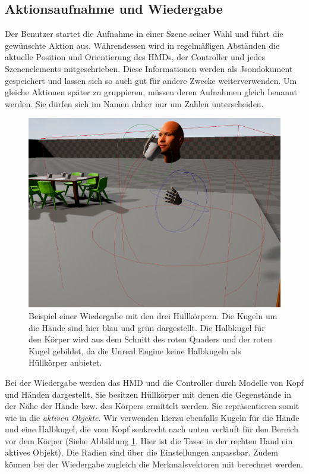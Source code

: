 \subsection{Aktionsaufnahme und Wiedergabe}
Der Benutzer startet die Aufnahme in einer Szene seiner Wahl und führt die gewünschte Aktion aus. Währendessen wird in regelmäßigen Abständen die aktuelle Position und Orientierung des HMDs, der Controller und jedes Szenenelements mitgeschrieben. Diese Informationen werden als Jsondokument gespeichert und lassen sich so auch gut für andere Zwecke weiterverwenden. Um gleiche Aktionen später zu gruppieren, müssen deren Aufnahmen gleich benannt werden. Sie dürfen sich im Namen daher nur um Zahlen unterscheiden.\newline
\begin{figure}[hbtp]
\includegraphics[width=1.0\linewidth]{PlaybackActor.png}
\caption{Beispiel einer Wiedergabe mit den drei Hüllkörpern. Die Kugeln um die Hände sind hier blau und grün dargestellt. Die Halbkugel für den Körper wird aus dem Schnitt des roten Quaders und der roten Kugel gebildet, da die Unreal Engine keine Halbkugeln als Hüllkörper anbietet.}
\label{fig:playback-actor}
\end{figure}
Bei der Wiedergabe werden das HMD und die Controller durch Modelle von Kopf und Händen dargestellt. Sie besitzen Hüllkörper mit denen die Gegenstände in der Nähe der Hände bzw. des Körpers ermittelt werden. Sie repräsentieren somit wie in \cite{scene-grok} die \textit{aktiven Objekte}. Wir verwenden hierzu ebenfalls Kugeln für die Hände und eine Halbkugel, die vom Kopf senkrecht nach unten verläuft für den Bereich vor dem Körper (Siehe Abbildung \ref{fig:playback-actor}. Hier ist die Tasse in der rechten Hand ein aktives Objekt). Die Radien sind über die Einstellungen anpassbar. Zudem können bei der Wiedergabe zugleich die Merkmalsvektoren mit berechnet werden.

